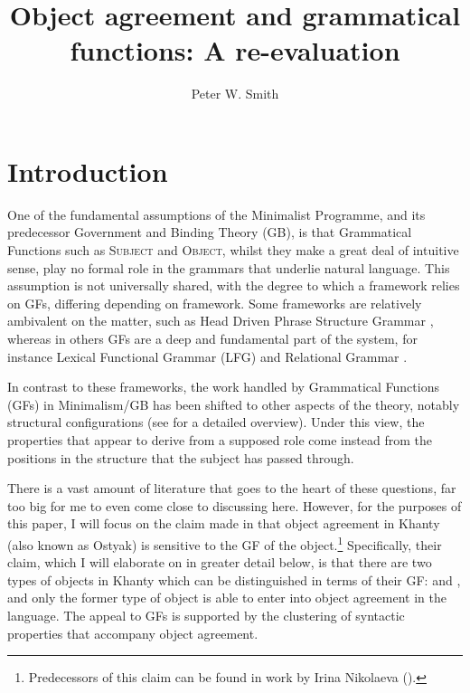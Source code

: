 \documentclass[output=paper
,modfonts
,nonflat]{langsci/langscibook}
\title{Object agreement and grammatical functions: A re-evaluation}
\author{Peter W. Smith\affiliation{Goethe-Universität, Frankfurt}}
\begin{document}
\maketitle



\section{Introduction} 

One of the fundamental assumptions of the Minimalist Programme, and its predecessor Government and Binding Theory (GB), is that Grammatical Functions such as \textsc{Subject} and \textsc{Object}, whilst they make a great deal of intuitive sense, play no formal role in the grammars that underlie natural language.
This assumption is not universally shared, with the degree to which a framework relies on GFs, differing depending on framework.
Some frameworks are relatively ambivalent on the matter, such as Head Driven Phrase Structure Grammar \citep{pollardsag1994}, whereas in others GFs are a deep and fundamental part of the system, for instance Lexical Functional Grammar (LFG) \citep{dalrymple2001} and Relational Grammar \citep{perlmutterpostal1983}. 

In contrast to these frameworks, the work handled by Grammatical Functions (GFs) in Minimalism/GB has been shifted to other aspects of the theory, notably structural configurations (see \citealt{mccloskey1997} for a detailed overview).
Under this view, the properties that appear to derive from a supposed \subj{} role come instead from the positions in the structure that the subject has passed through.

There is a vast amount of literature that goes to the heart of these questions, far too big for me to even come close to discussing here. However, for the purposes of this paper, I will focus on the claim made in \citet{dn2011} that object agreement in Khanty (also known as Ostyak) is sensitive to the GF of the object.\footnote{Predecessors of this claim can be found in work by Irina Nikolaeva (\citealt{nikolaeva1999,ostyakgrammar,nikolaeva2001}).} 
Specifically, their claim, which I will elaborate on in greater detail below, is that there are two types of objects in Khanty which can be distinguished in terms of their GF: \object{} and \robj, and only the former type of object is able to enter into object agreement in the language.
The appeal to GFs is supported by the clustering of syntactic properties that accompany object agreement.
\end{document}

